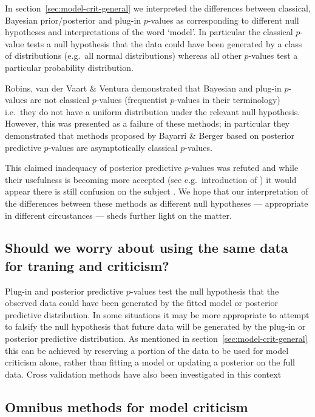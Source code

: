 \documentclass{article} %
\def\ie{i.e.\ }
\def\eg{e.g.\ }
\begin{document}
In section~\ref{sec:model-crit-general} we interpreted the differences between classical, Bayesian prior/posterior and plug-in $p$-values as corresponding to different null hypotheses and interpretations of the word `model'.
In particular the classical $p$-value tests a null hypothesis that the data could have been generated by a class of distributions (\eg all normal distributions) whereas all other $p$-values test a particular probability distribution.

Robins, van der Vaart \& Ventura \citep{Robins2000-oz} demonstrated that Bayesian and plug-in $p$-values are not classical $p$-values (frequentist $p$-values in their terminology) \ie they do not have a uniform distribution under the relevant null hypothesis.
However, this was presented as a failure of these methods; in particular they demonstrated that methods proposed by Bayarri \& Berger \citep{Bayarri1999-ty} based on posterior predictive $p$-values are asymptotically classical $p$-values.

This claimed inadequacy of posterior predictive $p$-values was refuted \citep{noauthor_undated-xk} and while their usefulness is becoming more accepted (see \eg introduction of \cite{Bayarri2007-cp}) it would appear there is still confusion on the subject \citep{Gelman2013-am}.
We hope that our interpretation of the differences between these methods as different null hypotheses --- appropriate in different circustances --- sheds further light on the matter.

\subsection{Should we worry about using the same data for traning and criticism?}

Plug-in and posterior predictive $p$-values test the null hypothesis that the observed data could have been generated by the fitted model or posterior predictive distribution.
In some situations it may be more appropriate to attempt to falsify the null hypothesis that future data will be generated by the plug-in or posterior predictive distribution.
As mentioned in section~\ref{sec:model-crit-general} this can be achieved by reserving a portion of the data to be used for model criticism alone, rather than fitting a model or updating a posterior on the full data.
Cross validation methods have also been investigated in this context \citep{Gelfand1992-ow, Gelfand1996-vy, Marshall2007-hd}

\subsection{Omnibus methods for model criticism}
\end{document}

